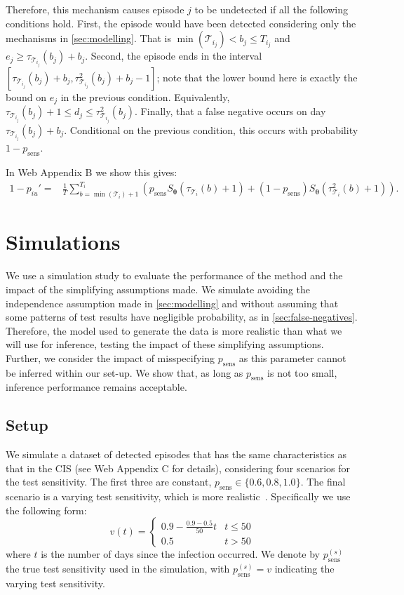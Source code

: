 \documentclass[referee,useAMS,usenatbib]{biom}
\renewcommand{\vec}[1]{\bm{#1}}
\newcommand{\psens}{p_\text{sens}}
\newcommand{\psenss}{p_\text{sens}^{(s)}}
\newcommand{\sched}{\mathcal{T}}
\begin{document}
Therefore, this mechanism causes episode $j$ to be undetected if all the following conditions hold.
First, the episode would have been detected considering only the mechanisms in \cref{sec:modelling}.
That is $\min(\sched_{i_j}) < b_j \leq T_{i_j}$ and $e_j \geq \tau_{\sched_{i_j}}(b_j) + b_j$.
Second, the episode ends in the interval $[\tau_{\sched_{i_j}}(b_j) + b_j, \tau^2_{\sched_{i_j}}(b_j) + b_j - 1]$; note that the lower bound here is exactly the bound on $e_j$ in the previous condition.
Equivalently, $\tau_{\sched_{i_j}}(b_j) + 1 \leq d_j \leq \tau^2_{\sched_{i_j}}(b_j)$.
Finally, that a false negative occurs on day $\tau_{\sched_{i_j}}(b_j) + b_j$. Conditional on the previous condition, this occurs with probability $1 - \psens$.

In Web Appendix B we show this gives:
\begin{align}
1 - p_{iu}'
=& \frac{1}{T} \sum_{b=\min(\sched_{i}) + 1}^{T_{i}} \left( p_\text{sens} S_{\vec{\theta}}(\tau_{\sched_{i}}(b) + 1) + (1 - p_\text{sens}) S_{\vec{\theta}}(\tau^2_{\sched_{i}}(b) + 1)\right).
\label{imperf-test:eq:pit-prime}
\end{align}

\section{Simulations} \label{sec:simulation}


We use a simulation study to evaluate the performance of the method and the impact of the simplifying assumptions made.
We simulate avoiding the independence assumption made in \cref{sec:modelling} and without assuming that some patterns of test results have negligible probability, as in \cref{sec:false-negatives}.
Therefore, the model used to generate the data is more realistic than what we will use for inference, testing the impact of these simplifying assumptions.
Further, we consider the impact of misspecifying $\psens$ as this parameter cannot be inferred within our set-up.
We show that, as long as $\psens$ is not too small, inference performance remains acceptable.

\subsection{Setup}

We simulate a dataset of detected episodes that has the same characteristics as that in the CIS (see Web Appendix C for details), considering four scenarios for the test sensitivity.
The first three are constant, $\psens \in \{ 0.6, 0.8, 1.0 \}$.
The final scenario is a varying test sensitivity, which is more realistic~\citep{blakeThesis}.
Specifically we use the following form:
\begin{equation}
  v(t) = \begin{cases}
    0.9 - \frac{0.9-0.5}{50}t &t \leq 50 \\
    0.5 &t > 50
  \end{cases}
  \label{imperf-test:eq:variable-test-sensitivity}
\end{equation}
where $t$ is the number of days since the infection occurred.
We denote by $\psenss$ the true test sensitivity used in the simulation, with $\psenss = v$ indicating the varying test sensitivity.
\end{document}
